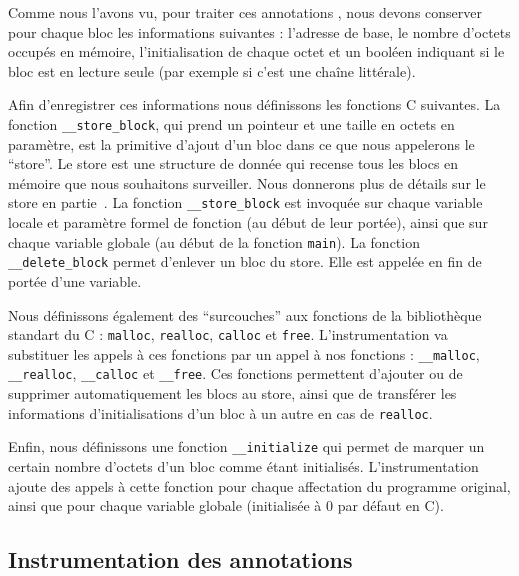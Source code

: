 Comme nous l'avons vu, pour traiter ces annotations \eacsl, nous devons
conserver pour chaque bloc les informations suivantes : l'adresse de base, le
nombre d'octets occupés en mémoire, l'initialisation de chaque octet et un
booléen indiquant si le bloc est en lecture seule (par exemple si c'est une
chaîne littérale).

Afin d'enregistrer ces informations nous définissons les fonctions C suivantes.
La fonction \lstinline'__store_block', qui prend un pointeur et une taille en
octets en paramètre, est la primitive d'ajout d'un bloc dans ce que nous
appelerons le ``store''.
Le store est une structure de donnée qui recense tous les blocs en mémoire que
nous souhaitons surveiller.
Nous donnerons plus de détails sur le store en partie~\label{sec:mem-model}.
La fonction \lstinline'__store_block' est invoquée sur chaque variable locale
et paramètre formel de fonction (au début de leur portée), ainsi que sur chaque
variable globale (au début de la fonction \lstinline'main').
La fonction \lstinline'__delete_block' permet d'enlever un bloc du store.
Elle est appelée en fin de portée d'une variable.

Nous définissons également des ``surcouches'' aux fonctions de la bibliothèque
standart du C : \lstinline'malloc', \lstinline'realloc', \lstinline'calloc' et
\lstinline'free'.
L'instrumentation va substituer les appels à ces fonctions par un appel à nos
fonctions : \lstinline'__malloc', \lstinline'__realloc', \lstinline'__calloc'
et \lstinline'__free'.
Ces fonctions permettent d'ajouter ou de supprimer automatiquement les blocs
au store, ainsi que de transférer les informations d'initialisations d'un bloc
à un autre en cas de \lstinline'realloc'.

Enfin, nous définissons une fonction \lstinline'__initialize' qui permet de
marquer un certain nombre d'octets d'un bloc comme étant initialisés.
L'instrumentation ajoute des appels à cette fonction pour chaque affectation du
programme original, ainsi que pour chaque variable globale (initialisée à 0 par
défaut en C).


\subsection{Instrumentation des annotations}


